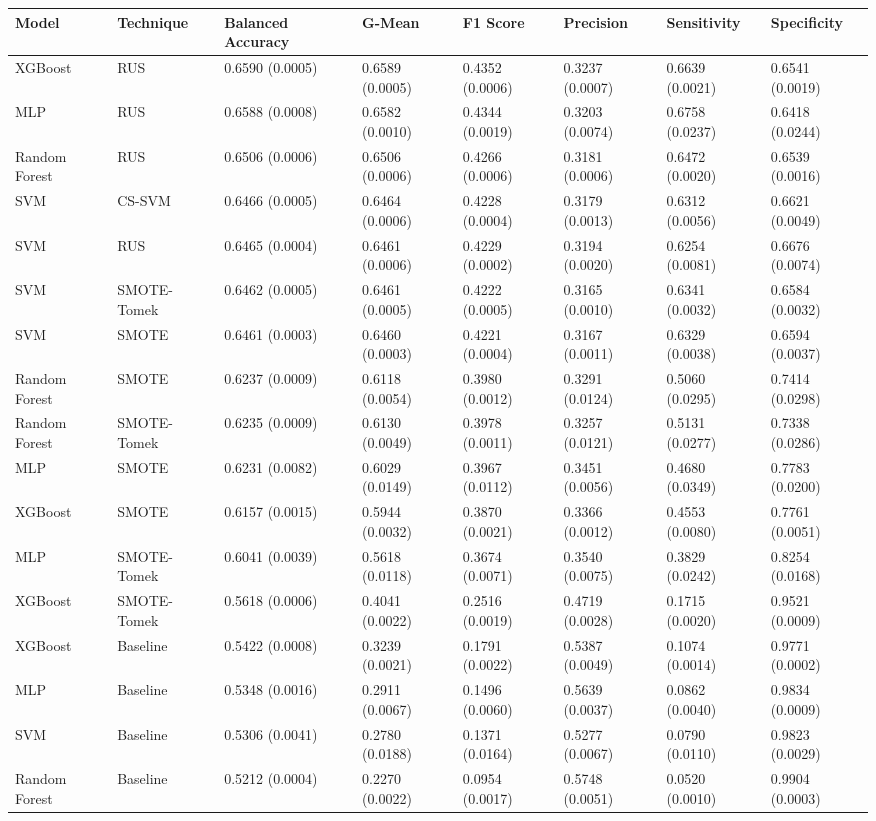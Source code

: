 \begin{tabular}{llllllll}
\toprule
Model & Technique & Balanced Accuracy & G-Mean & F1 Score & Precision & Sensitivity & Specificity \\
\midrule
XGBoost & RUS & 0.6590 (0.0005) & 0.6589 (0.0005) & 0.4352 (0.0006) & 0.3237 (0.0007) & 0.6639 (0.0021) & 0.6541 (0.0019) \\
MLP & RUS & 0.6588 (0.0008) & 0.6582 (0.0010) & 0.4344 (0.0019) & 0.3203 (0.0074) & 0.6758 (0.0237) & 0.6418 (0.0244) \\
Random Forest & RUS & 0.6506 (0.0006) & 0.6506 (0.0006) & 0.4266 (0.0006) & 0.3181 (0.0006) & 0.6472 (0.0020) & 0.6539 (0.0016) \\
SVM & CS-SVM & 0.6466 (0.0005) & 0.6464 (0.0006) & 0.4228 (0.0004) & 0.3179 (0.0013) & 0.6312 (0.0056) & 0.6621 (0.0049) \\
SVM & RUS & 0.6465 (0.0004) & 0.6461 (0.0006) & 0.4229 (0.0002) & 0.3194 (0.0020) & 0.6254 (0.0081) & 0.6676 (0.0074) \\
SVM & SMOTE-Tomek & 0.6462 (0.0005) & 0.6461 (0.0005) & 0.4222 (0.0005) & 0.3165 (0.0010) & 0.6341 (0.0032) & 0.6584 (0.0032) \\
SVM & SMOTE & 0.6461 (0.0003) & 0.6460 (0.0003) & 0.4221 (0.0004) & 0.3167 (0.0011) & 0.6329 (0.0038) & 0.6594 (0.0037) \\
Random Forest & SMOTE & 0.6237 (0.0009) & 0.6118 (0.0054) & 0.3980 (0.0012) & 0.3291 (0.0124) & 0.5060 (0.0295) & 0.7414 (0.0298) \\
Random Forest & SMOTE-Tomek & 0.6235 (0.0009) & 0.6130 (0.0049) & 0.3978 (0.0011) & 0.3257 (0.0121) & 0.5131 (0.0277) & 0.7338 (0.0286) \\
MLP & SMOTE & 0.6231 (0.0082) & 0.6029 (0.0149) & 0.3967 (0.0112) & 0.3451 (0.0056) & 0.4680 (0.0349) & 0.7783 (0.0200) \\
XGBoost & SMOTE & 0.6157 (0.0015) & 0.5944 (0.0032) & 0.3870 (0.0021) & 0.3366 (0.0012) & 0.4553 (0.0080) & 0.7761 (0.0051) \\
MLP & SMOTE-Tomek & 0.6041 (0.0039) & 0.5618 (0.0118) & 0.3674 (0.0071) & 0.3540 (0.0075) & 0.3829 (0.0242) & 0.8254 (0.0168) \\
XGBoost & SMOTE-Tomek & 0.5618 (0.0006) & 0.4041 (0.0022) & 0.2516 (0.0019) & 0.4719 (0.0028) & 0.1715 (0.0020) & 0.9521 (0.0009) \\
XGBoost & Baseline & 0.5422 (0.0008) & 0.3239 (0.0021) & 0.1791 (0.0022) & 0.5387 (0.0049) & 0.1074 (0.0014) & 0.9771 (0.0002) \\
MLP & Baseline & 0.5348 (0.0016) & 0.2911 (0.0067) & 0.1496 (0.0060) & 0.5639 (0.0037) & 0.0862 (0.0040) & 0.9834 (0.0009) \\
SVM & Baseline & 0.5306 (0.0041) & 0.2780 (0.0188) & 0.1371 (0.0164) & 0.5277 (0.0067) & 0.0790 (0.0110) & 0.9823 (0.0029) \\
Random Forest & Baseline & 0.5212 (0.0004) & 0.2270 (0.0022) & 0.0954 (0.0017) & 0.5748 (0.0051) & 0.0520 (0.0010) & 0.9904 (0.0003) \\
\bottomrule
\end{tabular}
